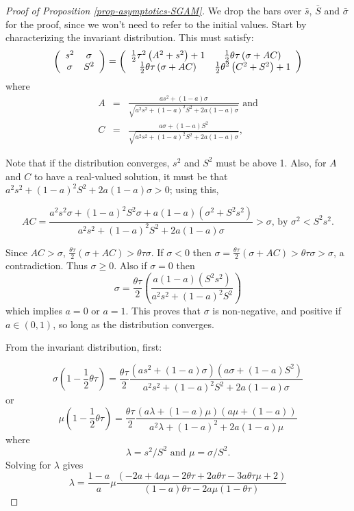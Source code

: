 \documentclass[
  12pt,
]{article}
\theoremstyle{definition}
\theoremstyle{definition}
\theoremstyle{definition}
\theoremstyle{definition}
\theoremstyle{remark}
\begin{document}
\begin{proof}[Proof of Proposition \ref{prop-asymptotics-SGAM}]
We drop the bars over $\bar{s}$, $\bar{S}$ and $\bar{\sigma}$ for the proof,
since we won't need to refer to the initial values.
Start by characterizing the invariant distribution. 
This must satisfy:%
\[
\left( 
\begin{array}{cc}
s^{2} & \sigma \\ 
\sigma & S^{2}%
\end{array}%
\right) =\left( 
\begin{array}{cc}
\frac{1}{2}\tau ^{2}\left( A^{2}+s^{2}\right) +1 & \frac{1}{2}%
\theta \tau \left( \sigma+AC\right)  \\ 
\frac{1}{2}\theta \tau \left( \sigma+AC\right)  & \frac{1}{%
2}\theta ^{2}\left( C^{2}+S^{2}\right) +1%
\end{array}%
\right) \allowbreak 
\]%
where%
\begin{eqnarray*}
A &=&\frac{as^{2}+\left( 1-a\right) \sigma}{\sqrt{a^{2}%
s^{2}+\left( 1-a\right) ^{2}S^{2}+2a\left( 1-a\right) \sigma%
}}\textrm{ \ and} \\
C &=&\frac{a\sigma+\left( 1-a\right) S^{2}}{\sqrt{a^{2}%
s^{2}+\left( 1-a\right) ^{2}S^{2}+2a\left( 1-a\right) \sigma%
}},
\end{eqnarray*}%

Note that if the distribution converges, $s^{2}$ and $S^{2}$
must be above 1. Also, for $A$ and $C$ to have a real-valued
solution, it must be that $a^{2}s^{2}+(1-a)^{2}S^{2}+2a(1-a)\sigma>0$;
using this,

\[
AC=\frac{a^{2}s^{2}\sigma+(1-a)^{2}S^{2}\sigma+a(1-a)(\sigma^{2}+S^{2}s^{2})}{a^{2}s^{2}+(1-a)^{2}S^{2}+2a(1-a)\sigma}>\sigma\textrm{, by }\sigma^{2}<S^{2}s^{2}.
\]

Since $AC>\sigma$, $\frac{\theta\tau}{2}(\sigma+AC)>\theta\tau\sigma$.
If $\sigma<0$ then $\sigma=\frac{\theta\tau}{2}(\sigma+AC)>\theta\tau\sigma>\sigma$,
a contradiction. Thus $\sigma\ge0$. Also if $\sigma=0$
then 
\[
\sigma=\frac{\theta\tau}{2}\left(\frac{a(1-a)(S^{2}s^{2})}{a^{2}s^{2}+(1-a)^{2}S^{2}}\right)
\]
which implies $a=0$ or $a=1$. This proves that $\sigma$ is
non-negative, and positive if $a\in(0,1)$, so long as the distribution
converges.

From the invariant distribution, first:

\[
\sigma\left(1-\frac{1}{2}\theta\tau\right)=\frac{\theta\tau}{2}\frac{\left(as^{2}+\left(1-a\right)\sigma\right)\left(a\sigma+\left(1-a\right)S^{2}\right)}{a^{2}s^{2}+\left(1-a\right)^{2}S^{2}+2a\left(1-a\right)\sigma}
\]
or
\[
\mu\left(1-\frac{1}{2}\theta\tau\right)=\frac{\theta\tau}{2}\frac{\left(a\lambda+\left(1-a\right)\mu\right)\left(a\mu+\left(1-a\right)\right)}{a^{2}\lambda+\left(1-a\right)^{2}+2a\left(1-a\right)\mu}
\]
where
\[
\lambda=s^{2}/S^{2}\text{ and }\mu=\sigma/S^{2}.
\]
Solving for $\lambda$ gives
\begin{equation}
\lambda=\frac{1-a}{a}\mu\frac{\left(-2a+4a\mu-2\theta\tau+2a\theta\tau-3a\theta\tau\mu+2\right)\allowbreak}{\left(1-a\right)\theta\tau-2a\mu\left(1-\theta\tau\right)}\label{L}
\end{equation}


\end{proof}
\end{document}
